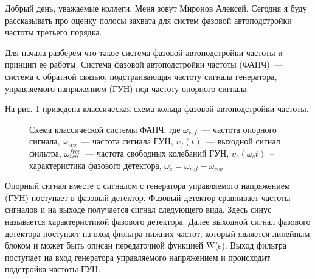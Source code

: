 \documentclass[a4paper,article,14pt]{extarticle}
\begin{document}
  Добрый день, уважаемые коллеги. Меня зовут Миронов Алексей. Сегодня я буду рассказывать про оценку полосы захвата для систем фазовой автоподстройки частоты третьего порядка. 

  Для начала разберем что такое система фазовой автоподстройки частоты и принцип ее работы. Система фазовой автоподстройки частоты (ФАПЧ)~--- система с обратной связью, подстраивающая частоту сигнала генератора, управляемого напряжением (ГУН) под частоту опорного сигнала.
  
   На рис. \ref{PLL-img} приведена классическая схема кольца фазовой автоподстройки частоты. 
\begin{figure}[H]
\begin{center}
\end{center}
\caption{Схема классической системы ФАПЧ, где $\omega_{ref}$~--- частота опорного сигнала, $\omega_{vco}$~--- частота сигнала ГУН, $\upsilon_f(t)$~--- выходной сигнал фильтра, $\omega_{vco}^{free}$~--- частота свободных колебаний ГУН, $\upsilon_e(\omega_{e}t)$~-- характеристика фазового детектора, $\omega_e = \omega_{ref}-\omega_{vco}$ \label{PLL-img}}
\end{figure}

  Опорный сигнал вместе с сигналом с генератора управляемого напряжением (ГУН) поступает в фазовый детектор. Фазовый детектор сравнивает частоты сигналов и на выходе получается сигнал следующего вида. Здесь синус называется характеристикой фазового детектора. Далее выходной сигнал фазового детектора поступает на вход фильтра нижних частот, который является линейным блоком и может быть описан передаточной функцией W(s). Выход фильтра поступает на вход генератора управляемого напряжением и происходит подстройка частоты ГУН. 
  
\end{document}
